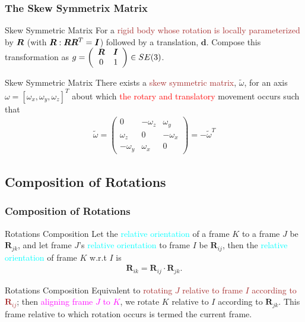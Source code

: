 \begin{frame}
	\frametitle{The Skew Symmetrix Matrix}
	\begin{block}{Skew Symmetric Matrix}
		For a \textcolor{brown}{rigid body whose rotation is locally parameterized} by $\bm{R}$ (with $\bm{R}: \bm{R} \bm{R}^T = \bm{I}$) followed by a translation, $\bm{d}$. Compose this transformation as
		$g = \left(\begin{array}{ccc}
			\bm{R} & \bm{I} \\
			0 & 1
		\end{array}\right) \in {SE}(3)$.
	\end{block}
	
	\begin{block}{Skew Symmetric Matrix}
		There exists a \textcolor{brown}{skew symmetric matrix}, $\tilde{\omega}$, for an axis $\omega = [\omega_x, \omega_y, \omega_z]^T$ about which \textcolor{red}{the rotary and translatory} movement occurs such that
		\begin{align}
			\tilde{\omega} = \left(\begin{array}{ccc}
				0 & -\omega_z & \omega_y \\
				\omega_z & 0 & -\omega_x \\
				-\omega_y & \omega_x & 0 
			\end{array}\right) = - \tilde{\omega}^T
		\end{align}
	\end{block}
\end{frame}

\subsection{Composition of Rotations}
\begin{frame}
	\frametitle{Composition of Rotations}
	\begin{block}{Rotations Composition}
		Let the \textcolor{cyan}{relative orientation} of a frame $K$  to a frame $J$ be $\bm{R}_{jk}$, and let frame $J$'s  \textcolor{cyan}{relative orientation} to frame $I$ be $\bm{R}_{ij}$, then the \textcolor{cyan}{relative orientation} of frame $K$  w.r.t $I$ is 
		\begin{align}
			\bm{R}_{ik} = \bm{R}_{ij} \cdot \bm{R}_{jk}.
		\end{align} 
	\end{block}
	
	\begin{block}{Rotations Composition}
		Equivalent to \textcolor{brown}{rotating $J$ relative to frame $I$ according to $\bm{R}_{ij}$}; then \textcolor{magenta}{aligning frame $J$  to $K$}, we \textcolor{light-blue}{rotate $K$ relative to $I$ according to $\bm{R}_{jk}$}. This frame relative to which rotation occurs is termed the \textcolor{light-red}{current frame}. 
	\end{block}
\end{frame}


